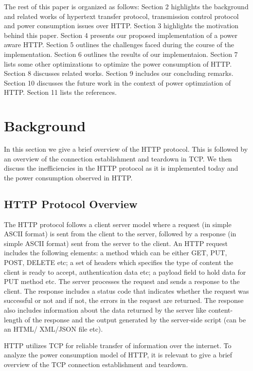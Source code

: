 \documentclass[9pt]{sigplan-proc-varsize}
\begin{document}
The rest of this paper is organized as follows: Section 2 highlights the background and related works of hypertext transfer protocol, transmission control protocol and power consumption issues over HTTP. Section 3 highlights the motivation behind this paper. Section 4 presents our proposed implementation of a power aware HTTP. Section 5 outlines the challenges faced during the course of the implementation. Section 6 outlines the results of our implementaion. Section 7 lists some other optimizations to optimize the power consumption of HTTP. Section 8 discusses related works. Section 9 includes our concluding remarks. Section 10 discusses the future work in the context of power optimziation of HTTP. Section 11 lists the references.

\bigskip

\section{Background}

In this section we give a brief overview of the HTTP protocol. This is followed by an overview of the connection establishment and teardown in TCP. We then discuss the inefficiencies in the HTTP protocol as it is implemented today and the power consumption observed in HTTP.

\subsection{HTTP Protocol Overview}

The HTTP protocol follows a client server model where a request (in simple ASCII format) is sent from the client to the server, followed by a response (in simple ASCII format) sent from the server to the client. An HTTP request includes the following elements: a method which can be either GET, PUT, POST, DELETE etc; a set of headers which specifies the type of content the client is ready to accept, authentication data etc; a payload field to hold data for PUT method etc. The server processes the request and sends a response to the client. The response includes a status code that indicates whether the request was successful or not and if not, the errors in the request are returned. The response also includes information about the data returned by the server like content-length of the response and the output generated by the server-side script (can be an HTML/ XML/JSON file etc). 

HTTP utilizes TCP for reliable transfer of information over the internet. To analyze the power consumption model of HTTP, it is relevant to give a brief overview of the TCP connection establishment and teardown.
\end{document}

